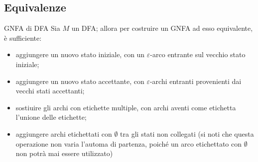 \documentclass[a4paper, 12pt]{report}
\begin{document}
    \subsection{Equivalenze}

    \begin{framedmeth}[label={dfa into gnfa}]{GNFA di DFA}
        Sia $M$ un DFA; allora per costruire un GNFA ad esso equivalente, è sufficiente:

        \begin{itemize}
            \item aggiungere un nuovo stato iniziale, con un $\varepsilon$-arco entrante sul vecchio stato iniziale;
            \item aggiungere un nuovo stato accettante, con $\varepsilon$-archi entranti provenienti dai vecchi stati accettanti;
            \item sostiuire gli archi con etichette multiple, con archi aventi come etichetta l'unione delle etichette;
            \item aggiungere archi etichettati con $\emptyset$ tra gli stati non collegati (si noti che questa operazione non varia l'automa di partenza, poiché un arco etichettato con $\emptyset$ non potrà mai essere utilizzato)
        \end{itemize}
    \end{framedmeth}
\end{document}

